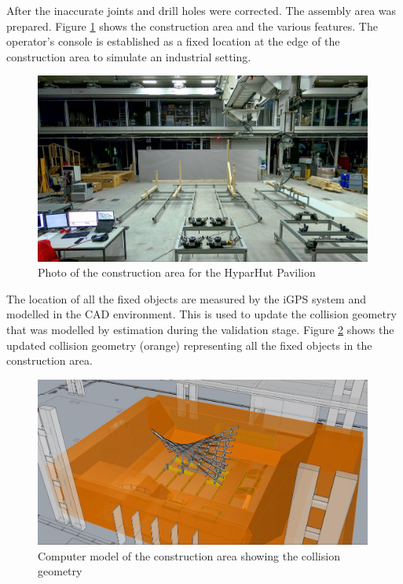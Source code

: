 After the inaccurate joints and drill holes were corrected. The assembly area was prepared. Figure \ref{fig:photo-of-the-construction-area-for-the-hyparhut-pavilion} shows the construction area and the various features. The operator’s console is established as a fixed location at the edge of the construction area to simulate an industrial setting.

\begin{figure}[!h]
    \centering
    \includegraphics[width=0.99\textwidth]{images/7b/img14.jpg}
    \caption{Photo of the construction area for the HyparHut Pavilion}
    \label{fig:photo-of-the-construction-area-for-the-hyparhut-pavilion}
\end{figure}

The location of all the fixed objects are measured by the iGPS system and modelled in the CAD environment. This is used to update the collision geometry that was modelled by estimation during the validation stage. Figure \ref{fig:hyperhut-collision-geometry} shows the updated collision geometry (orange) representing all the fixed objects in the construction area. 

\begin{figure}[!h]
    \centering
    \includegraphics[width=0.99\textwidth]{images/7b/img15.jpg}
    \caption{Computer model of the construction area showing the collision geometry}
    \label{fig:hyperhut-collision-geometry}
\end{figure}

